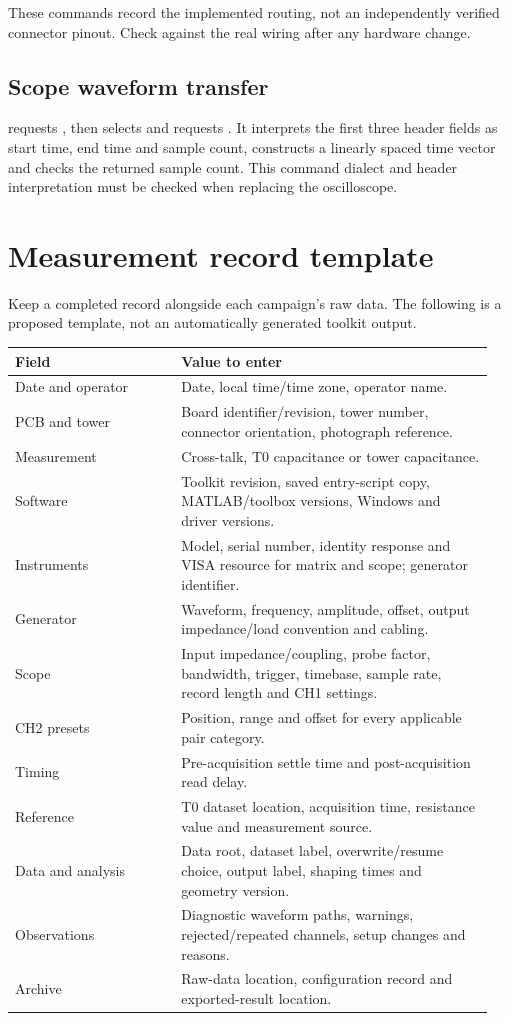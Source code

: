 These commands record the implemented routing, not an independently verified connector pinout. Check  against the real wiring after any hardware change.

\subsection{Scope waveform transfer}
 requests , then selects  and requests . It interprets the first three header fields as start time, end time and sample count, constructs a linearly spaced time vector and checks the returned sample count. This command dialect and header interpretation must be checked when replacing the oscilloscope.

\section{Measurement record template}
\label{sec:record}
Keep a completed record alongside each campaign's raw data. The following is a proposed template, not an automatically generated toolkit output.
\begin{longtable}{@{}>{\raggedright\arraybackslash}p{0.33\linewidth}>{\raggedright\arraybackslash}p{0.62\linewidth}@{}}
\toprule
Field & Value to enter \\
\midrule
\endhead
Date and operator & Date, local time/time zone, operator name. \\
PCB and tower & Board identifier/revision, tower number, connector orientation, photograph reference. \\
Measurement & Cross-talk, T0 capacitance or tower capacitance. \\
Software & Toolkit revision, saved entry-script copy, MATLAB/toolbox versions, Windows and driver versions. \\
Instruments & Model, serial number, identity response and VISA resource for matrix and scope; generator identifier. \\
Generator & Waveform, frequency, amplitude, offset, output impedance/load convention and cabling. \\
Scope & Input impedance/coupling, probe factor, bandwidth, trigger, timebase, sample rate, record length and CH1 settings. \\
CH2 presets & Position, range and offset for every applicable pair category. \\
Timing & Pre-acquisition settle time and post-acquisition read delay. \\
Reference & T0 dataset location, acquisition time, resistance value and measurement source. \\
Data and analysis & Data root, dataset label, overwrite/resume choice, output label, shaping times and geometry version. \\
Observations & Diagnostic waveform paths, warnings, rejected/repeated channels, setup changes and reasons. \\
Archive & Raw-data location, configuration record and exported-result location. \\
\bottomrule
\end{longtable}


